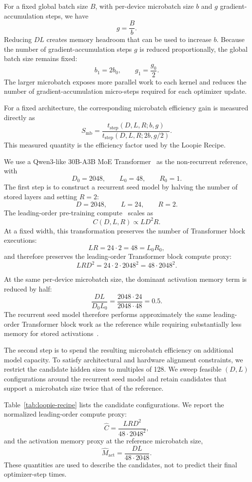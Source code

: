 For a fixed global batch size \( B \), with per-device microbatch size \( b \) and \( g \) gradient-accumulation steps, we have
\[
g = \frac{B}{b}.
\]
Reducing $DL$ creates memory headroom that can be used to increase
$b$. Because the number of gradient-accumulation steps $g$ is
reduced proportionally, the global batch size remains fixed:
\[
b_{1}
=
2b_{0},
\qquad
g_1
=
\frac{g_0}{2}.
\]
The larger microbatch exposes more parallel work to each kernel and
reduces the number of gradient-accumulation micro-steps required for
each optimizer update.

For a fixed architecture, the corresponding microbatch efficiency gain
is measured directly as
\[
S_{\mathrm{mb}}
=
\frac{
t_{\mathrm{step}}(D,L,R;b,g)
}{
t_{\mathrm{step}}(D,L,R;2b,g/2)
}.
\]
This measured quantity is the efficiency factor used by the
Loopie Recipe.

We use a Qwen3-like 30B-A3B MoE
Transformer~\citep{qwen3} as the non-recurrent reference, with
\[
D_0 = 2048,
\qquad
L_0 = 48,
\qquad
R_0 = 1.
\]
The first step is to construct a recurrent seed model by halving the number of
stored layers and setting $R=2$:
\[
D = 2048,
\qquad
L = 24,
\qquad
R = 2.
\]
The leading-order pre-training compute~\citep{hoffmann2022training} scales as
\[
C(D,L,R) \propto L D^2 R.
\]
At a fixed width, this transformation preserves the number of Transformer block executions:
\[
LR
=
24\cdot 2
=
48
=
L_0R_0,
\]
and therefore preserves the leading-order Transformer block compute proxy:
\[
LRD^2
=
24\cdot 2\cdot 2048^2
=
48\cdot 2048^2.
\]

At the same per-device microbatch size, the dominant activation memory term is reduced by half:
\[
\frac{DL}{D_0L_0}
=
\frac{2048\cdot 24}{2048\cdot 48}
=
0.5.
\]
The recurrent seed model therefore performs approximately the same
leading-order Transformer block work as the reference while requiring substantially less memory for stored activations~\citep{megatron-lm,3433701.3433727}.

The second step is to spend the resulting microbatch efficiency on
additional model capacity. To satisfy architectural and hardware alignment constraints, we restrict the candidate hidden sizes to multiples of 128. We sweep feasible $(D,L)$ configurations around the recurrent seed model and retain candidates that support a microbatch size twice that of the reference.

Table~\ref{tab:loopie-recipe} lists the candidate configurations. We report the normalized leading-order compute proxy:
\[
\widehat{C}
=
\frac{LRD^2}{48\cdot 2048^2},
\]
and the activation memory proxy at the reference microbatch size,
\[
\widehat{M}_{\mathrm{act}}
=
\frac{DL}{48\cdot 2048}.
\]
These quantities are used to describe the candidates, not to predict
their final optimizer-step times.

